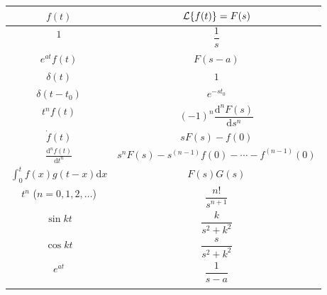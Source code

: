 \documentclass[a4paper, 10pt, ]{article}
\begin{document}
    \begin{longtable}{cc}

        \toprule
        $f(t)$                                  & $\mathcal{L}{\left\{f(t)\right\}}=F(s)$ \\
        \midrule
        \endhead
        \addlinespace[3mm]
        $1$                                     &    			  $\dfrac{1}{s}$                        \\ \addlinespace[3mm]
        $e^{at}f(t)$	                        & $F(s-a)$	                                            \\ \addlinespace[3mm]
        $\delta(t)$	                            & $1$                                                   \\ \addlinespace[3mm]
        $\delta(t-t_0)$                         & $e^{-st_0}$                                           \\ \addlinespace[3mm]
        $t^nf(t)$ 	                            & $(-1)^n\dfrac{\text{d}^n F(s)}{\text{d} s^n}$                          \\ \addlinespace[3mm]
        $\dot f(t)$ 	                            & $sF(s) - f(0)$                                       \\ \addlinespace[3mm]
        $\displaystyle \frac{\text{d}^n f(t)}{\text{d}t^n}$ 	                            & $s^nF(s) - s^{(n-1)} f(0) - \cdots - f^{(n-1)}(0)$    \\ \addlinespace[3mm]
        $\displaystyle{\int_0^t f(x)g(t-x) \text{d}x}$  & $F(s)G(s)$                                            \\ \addlinespace[3mm]
        $t^n$ ($n=0,1,2,\dots$)                 & $\dfrac{n!}{s^{n+1}}$                                 \\ \addlinespace[3mm]
        $\sin kt$ 	                            & $\dfrac{k}{s^2+k^2}$                                   \\ \addlinespace[3mm]
        $\cos kt$ 	                            & $\dfrac{s}{s^2+k^2}$                                   \\ \addlinespace[3mm]
        $e^{at}$ 	                            & $\dfrac{1}{s-a}$ 	                                      \\ \addlinespace[3mm]

\end{longtable}
\end{document}
